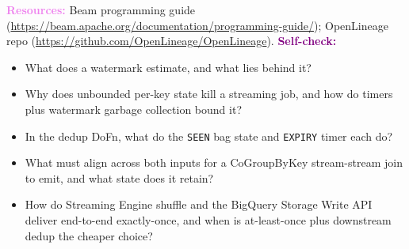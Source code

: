 \documentclass[11pt, a4paper]{article}
\newcommand{\resources}[1]{\vspace{1mm}\noindent\textbf{\textcolor{violet}{Resources:}} #1}
\newcommand{\selfcheck}[1]{\vspace{1mm}\noindent\textbf{\textcolor{purple}{Self-check:}} #1}
\begin{document}
\resources{Beam programming guide (\url{https://beam.apache.org/documentation/programming-guide/}); OpenLineage repo (\url{https://github.com/OpenLineage/OpenLineage}).}
\selfcheck{\begin{itemize}[label=-, nosep, leftmargin=1.5em]
    \item What does a watermark estimate, and what lies behind it?
    \item Why does unbounded per-key state kill a streaming job, and how do timers plus watermark garbage collection bound it?
    \item In the dedup DoFn, what do the \texttt{SEEN} bag state and \texttt{EXPIRY} timer each do?
    \item What must align across both inputs for a CoGroupByKey stream-stream join to emit, and what state does it retain?
    \item How do Streaming Engine shuffle and the BigQuery Storage Write API deliver end-to-end exactly-once, and when is at-least-once plus downstream dedup the cheaper choice?
\end{itemize}}
\end{document}
